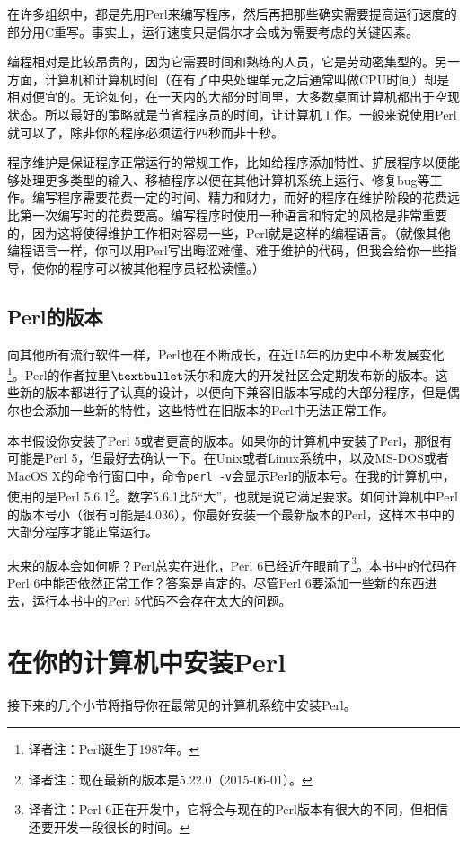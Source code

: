 在许多组织中，都是先用Perl来编写程序，然后再把那些确实需要提高运行速度的部分用C重写。事实上，运行速度只是偶尔才会成为需要考虑的关键因素。

编程相对是比较昂贵的，因为它需要时间和熟练的人员，它是劳动密集型的。另一方面，计算机和计算机时间（在有了中央处理单元之后通常叫做CPU时间）却是相对便宜的。无论如何，在一天内的大部分时间里，大多数桌面计算机都出于空现状态。所以最好的策略就是节省程序员的时间，让计算机工作。一般来说使用Perl就可以了，除非你的程序必须运行四秒而非十秒。

程序维护是保证程序正常运行的常规工作，比如给程序添加特性、扩展程序以便能够处理更多类型的输入、移植程序以便在其他计算机系统上运行、修复bug等工作。编写程序需要花费一定的时间、精力和财力，而好的程序在维护阶段的花费远比第一次编写时的花费要高。编写程序时使用一种语言和特定的风格是非常重要的，因为这将使得维护工作相对容易一些，Perl就是这样的编程语言。（就像其他编程语言一样，你可以用Perl写出晦涩难懂、难于维护的代码，但我会给你一些指导，使你的程序可以被其他程序员轻松读懂。）

\subsection{Perl的版本}
向其他所有流行软件一样，Perl也在不断成长，在近15年的历史中不断发展变化\footnote{译者注：Perl诞生于1987年。}。Perl的作者拉里$\textbullet$沃尔和庞大的开发社区会定期发布新的版本。这些新的版本都进行了认真的设计，以便向下兼容旧版本写成的大部分程序，但是偶尔也会添加一些新的特性，这些特性在旧版本的Perl中无法正常工作。

本书假设你安装了Perl 5或者更高的版本。如果你的计算机中安装了Perl，那很有可能是Perl 5，但最好去确认一下。在Unix或者Linux系统中，以及MS-DOS或者MacOS X的命令行窗口中，命令\verb|perl -v|会显示Perl的版本号。在我的计算机中，使用的是Perl 5.6.1\footnote{译者注：现在最新的版本是5.22.0（2015-06-01）。}。数字5.6.1比5“大”，也就是说它满足要求。如何计算机中Perl的版本号小（很有可能是4.036），你最好安装一个最新版本的Perl，这样本书中的大部分程序才能正常运行。

未来的版本会如何呢？Perl总实在进化，Perl 6已经近在眼前了\footnote{译者注：Perl 6正在开发中，它将会与现在的Perl版本有很大的不同，但相信还要开发一段很长的时间。}。本书中的代码在Perl 6中能否依然正常工作？答案是肯定的。尽管Perl 6要添加一些新的东西进去，运行本书中的Perl 5代码不会存在太大的问题。

\section{在你的计算机中安装Perl}
接下来的几个小节将指导你在最常见的计算机系统中安装Perl。

